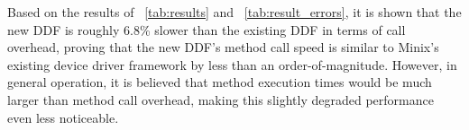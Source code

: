 Based on the results of \tablename~\ref{tab:results} and
\tablename~\ref{tab:result_errors}, it is shown that the new DDF
is roughly 6.8\% slower than the existing DDF in terms of call overhead,
proving that the new DDF's method call speed is similar to Minix's existing
device driver framework by less than an order-of-magnitude.  However, in
general operation, it is believed that method execution times would be much
larger than method call overhead, making this slightly degraded performance
even less noticeable.

%
